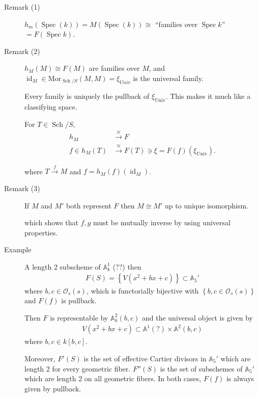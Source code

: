 \begin{description}
\item[Remark (1)]
\(h_m(\operatorname{Spec}(k)) = M(\operatorname{Spec}(k)) \cong\)
``families over \(\operatorname{Spec}k\)''
\(= F(\operatorname{Spec}k)\).
\item[Remark (2)]
\(h_M(M) \cong F(M)\) are families over \(M\), and
\(\operatorname{id}_M \in \mathrm{Mor}_{{\operatorname{Sch}}/S}(M, M) = \xi_{Univ}\)
is the universal family.

Every family is uniquely the pullback of \(\xi_{\text{Univ}}\). This
makes it much like a classifying space.

For \(T\in {\operatorname{Sch}}/S\),
\begin{align*} h_M &\xrightarrow{\cong} F \\ f\in h_M(T) &\xrightarrow{\cong} F(T) \ni \xi = F(f)(\xi_{\text{Univ}}) .\end{align*}

where \(T\xrightarrow{f} M\) and \(f = h_M(f)(\operatorname{id}_M)\).
\item[Remark (3)]
If \(M\) and \(M'\) both represent \(F\) then \(M \cong M'\) up to
unique isomorphism.

\begin{center}
\end{center}

which shows that \(f, g\) must be mutually inverse by using universal
properties.
\item[Example]
A length 2 subscheme of \({\mathbb{A}}^1_k\) (??) then
\begin{align*}
F(S) = \left\{{ V(x^2 + bx + c)}\right\} \subset {\mathbb{A}}_5'
\end{align*}
where \(b, c \in {\mathcal{O}}_s(s)\), which is functorially bijective
with \(\left\{{b, c \in {\mathcal{O}}_s(s)}\right\}\) and \(F(f)\) is
pullback.

Then \(F\) is representable by \({\mathbb{A}}_k^2(b, c)\) and the
universal object is given by
\begin{align*}
V(x^2 + bx + c) \subset {\mathbb{A}}^1(?) \times{\mathbb{A}}^2(b, c)
\end{align*}
where \(b, c \in k[b, c]\).

Moreover, \(F'(S)\) is the set of effective Cartier divisors in
\({\mathbb{A}}_5'\) which are length 2 for every geometric fiber.
\(F''(S)\) is the set of subschemes of \({\mathbb{A}}_5'\) which are
length 2 on all geometric fibers. In both cases, \(F(f)\) is always
given by pullback.
\end{description}

